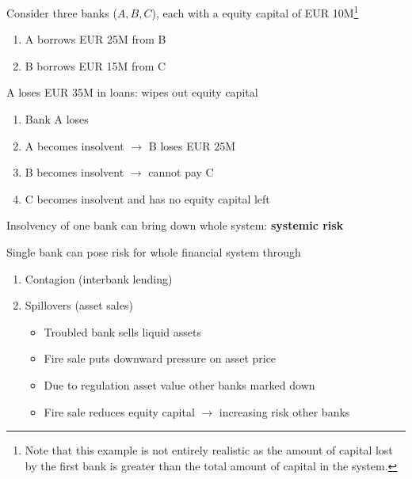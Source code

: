 \documentclass{beamer}
\begin{document}
\begin{frame}
 Consider three banks ($A,B,C$), each with a equity capital of EUR 10M\footnote{Note that this example is not entirely realistic as the amount of capital lost by the first bank is greater than the total amount of capital in the system.}  
 \begin{enumerate}
   \item A borrows EUR 25M from B
   \item B borrows EUR 15M from C 
 \end{enumerate}
 \medskip
 A loses EUR 35M in loans: wipes out equity capital
\begin{enumerate}
  \item Bank A loses 
  \item A becomes insolvent $\rightarrow$ B loses EUR 25M
  \item B becomes insolvent $\rightarrow$ cannot pay C
  \item C becomes insolvent and has no equity capital left
\end{enumerate}
Insolvency of one bank can bring down whole system: \textbf{systemic risk}
\end{frame}

\begin{frame}
  Single bank can pose risk for whole financial system through  
\begin{enumerate}
  \item Contagion (interbank lending)
  \item Spillovers (asset sales)
  \begin{itemize}
    \item Troubled bank sells liquid assets
    \item Fire sale puts downward pressure on asset price
    \item Due to regulation asset value other banks marked down
    \item Fire sale reduces equity capital $\rightarrow$ increasing risk other banks
  \end{itemize}
\end{enumerate}
\end{frame}
\end{document}
